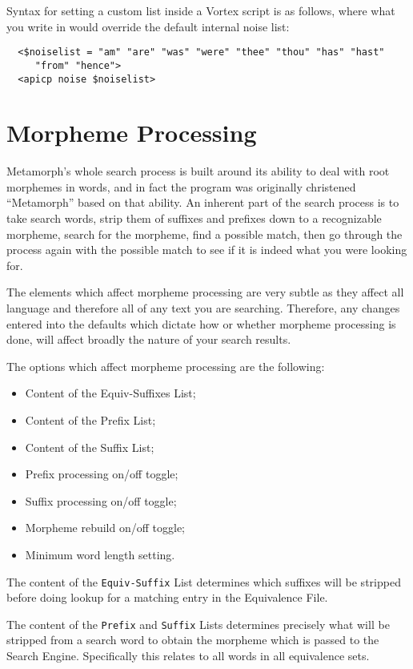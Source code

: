 Syntax for setting a custom list inside a Vortex script is as
follows, where what you write in would override the default internal
noise list:

\begin{verbatim}
  <$noiselist = "am" "are" "was" "were" "thee" "thou" "has" "hast"
     "from" "hence">
  <apicp noise $noiselist>
\end{verbatim}

\section{Morpheme Processing}

Metamorph's whole search process is built around its ability to deal
with root morphemes in words, and in fact the program was originally
christened ``Metamorph'' based on that ability.  An inherent part of
the search process is to take search words, strip them of suffixes and
prefixes down to a recognizable morpheme, search for the morpheme,
find a possible match, then go through the process again with the
possible match to see if it is indeed what you were looking for.

The elements which affect morpheme processing are very subtle as they
affect all language and therefore all of any text you are searching.
Therefore, any changes entered into the defaults which dictate how or
whether morpheme processing is done, will affect broadly the nature of
your search results.

The options which affect morpheme processing are the following:

\begin{itemize}
\item  Content of the Equiv-Suffixes List;
\item  Content of the Prefix List;
\item  Content of the Suffix List;
\item  Prefix processing on/off toggle;
\item  Suffix processing on/off toggle;
\item  Morpheme rebuild on/off toggle;
\item  Minimum word length setting.
\end{itemize}

The content of the \verb`Equiv-Suffix` List determines which suffixes
will be stripped before doing lookup for a matching entry in the
Equivalence File.

The content of the \verb`Prefix` and \verb`Suffix` Lists determines
precisely what will be stripped from a search word to obtain the
morpheme which is passed to the Search Engine.  Specifically this
relates to all words in all equivalence sets.

